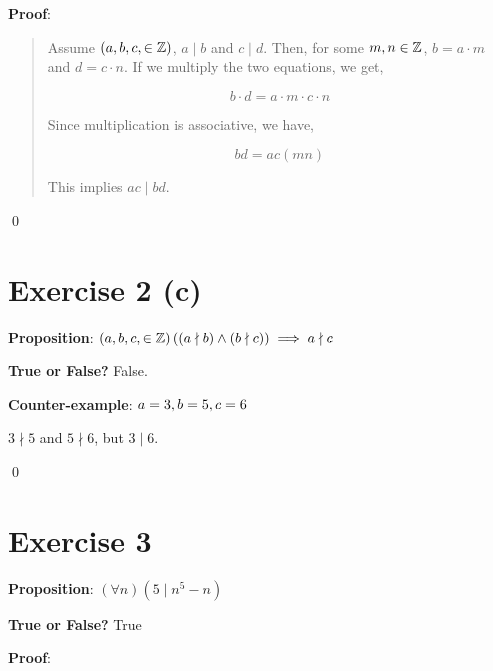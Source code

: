\documentclass{article} %
\begin{document}
\bigskip
\noindent
\textbf{Proof}:
\begin{quote}
    Assume $(a,\space b,\space c,\space \in \mathbb{Z})$, $a \mid b$ and $c \mid d$. Then, for some $m, \space n \in \mathbb{Z}$, $b = a\cdot m$ and $d = c \cdot n$.
    If we multiply the two equations, we get,

    \[b \cdot d = a \cdot m \cdot c \cdot n\]

    Since multiplication is associative, we have,

    \[bd = ac (m n)\]

    This implies $ac \mid bd$.
\end{quote}

\qed
\bigskip

\section*{Exercise 2 (c)}

\bigskip
\noindent
\textbf{Proposition}: $(a,\space b,\space c,\space \in \mathbb{Z}) \left((a \nmid b) \land (b \nmid c) \right) \implies a \nmid c$

\bigskip
\noindent
\textbf{True or False?} False.

\bigskip
\noindent
\textbf{Counter-example}: $a = 3, \space b = 5, \space c = 6$

$3 \nmid 5$ and $5 \nmid 6$, but $3 \mid 6$.

\qed
\bigskip

\section*{Exercise 3}

\bigskip
\noindent
\textbf{Proposition}: $(\forall n)(5 \mid n^5 - n)$

\bigskip
\noindent
\textbf{True or False?} True

\bigskip
\noindent
\textbf{Proof}:
\end{document}
